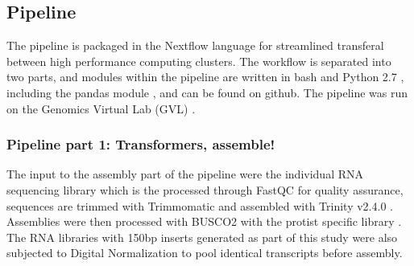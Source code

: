 \documentclass[12pt]{article}
\begin{document}
\subsection*{Pipeline}
The pipeline is packaged in the Nextflow language \cite{nextflow} for streamlined transferal between high performance computing clusters. 
The workflow is separated into two parts, and modules within the pipeline are written in bash and Python 2.7 \cite{python}, including the pandas module \cite{pandas}, and can be found on github. 
The pipeline was run on the Genomics Virtual Lab (GVL) \cite{afgan2015genomics}.
\subsubsection*{Pipeline part 1: Transformers, assemble!}
The input to the assembly part of the pipeline were the individual RNA sequencing library which is the processed through FastQC \cite{fastqc} for quality assurance, sequences are trimmed with Trimmomatic \cite{bolger2014trimmomatic} and assembled with Trinity v2.4.0 \cite{haas2013novo}. 
Assemblies were then processed with BUSCO2 with the protist specific library \cite{simao2015busco}.
The RNA libraries with 150bp inserts generated as part of this study were also subjected to Digital Normalization \cite{diginorm} to pool identical transcripts before assembly.                                                                                                                                                                                                                                                                                                                                                                                                                                                                                                                                                                                                                                                                                                                                                                                                                                                                                                                                                                                                                                                                                                                                                                                                                                                                                                                                           
\end{document}

